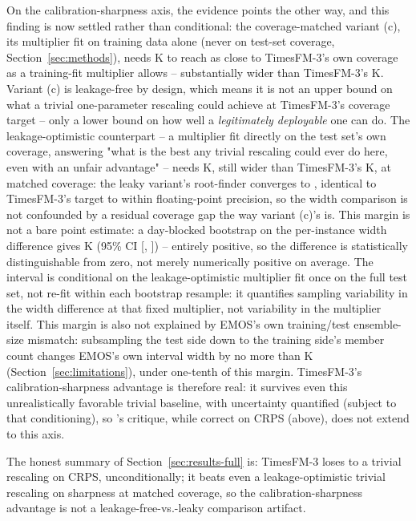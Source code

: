 On the calibration-sharpness axis, the evidence points the other way,
and this finding is now settled rather than conditional: the
coverage-matched variant (c), its multiplier fit on training data alone
(never on test-set coverage, Section~\ref{sec:methods}), needs
\WidthInflCFull{} K to reach as close to TimesFM-3's own coverage as a
training-fit multiplier allows -- substantially wider than TimesFM-3's
\WidthTsfmFull{} K. Variant (c) is leakage-free by design, which means it
is not an upper bound on what a trivial one-parameter rescaling could
achieve at TimesFM-3's coverage target -- only a lower bound on how well
a \emph{legitimately deployable} one can do. The leakage-optimistic
counterpart -- a multiplier fit directly on the test set's own coverage,
answering "what is the best any trivial rescaling could ever do here,
even with an unfair advantage" -- needs \InflLeakyWidth{} K, still wider
than TimesFM-3's \WidthTsfmFull{} K, at matched coverage: the leaky
variant's root-finder converges to \InflLeakyCoverage{}, identical to
TimesFM-3's \CoverageTsfmFull{} target to within floating-point
precision, so the width comparison is not confounded by a residual
coverage gap the way variant (c)'s is. This margin is not a bare point
estimate: a day-blocked bootstrap on the per-instance width difference
gives \InflLeakyWidthDiffPoint{} K (95\% CI
[\InflLeakyWidthDiffCiLow{}, \InflLeakyWidthDiffCiHigh{}]) -- entirely
positive, so the difference is statistically distinguishable from zero,
not merely numerically positive on average. The interval is conditional
on the leakage-optimistic multiplier fit once on the full test set, not
re-fit within each bootstrap resample: it quantifies sampling variability
in the width difference at that fixed multiplier, not variability in the
multiplier itself. This margin is also not explained by EMOS's own
training/test ensemble-size mismatch: subsampling the test side down to
the training side's member count changes EMOS's own interval width by no
more than \EnsSubsampleWidthDiffLocal{} K (Section~\ref{sec:limitations}),
under one-tenth of this margin. TimesFM-3's
calibration-sharpness advantage is therefore real: it survives even this
unrealistically favorable trivial baseline, with uncertainty quantified
(subject to that conditioning), so \citet{zhang_2025_context_parroting}'s
critique, while correct on CRPS (above), does not extend to this axis.

The honest summary of Section~\ref{sec:results-full} is: TimesFM-3 loses
to a trivial rescaling on CRPS, unconditionally; it beats even a
leakage-optimistic trivial rescaling on sharpness at matched coverage,
so the calibration-sharpness advantage is not a leakage-free-vs.-leaky
comparison artifact.

